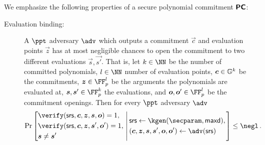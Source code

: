 \documentclass[runningheads,11pt]{llncs}
\begin{document}
We emphasize the following properties of a secure polynomial commitment
$\bm{\mathsf{PC}}$:
\begin{description}
\item[Evaluation binding:] A $\ppt$ adversary $\adv$ which outputs a commitment
  $\vec{c}$ and evaluation points $\vec{z}$ has at most negligible chances to open
  the commitment to two different evaluations $\vec{s}, \vec{s'}$. That is, let
  $k \in \NN$ be the number of committed polynomials, $l \in \NN$ number of
  evaluation points, $\vec{c} \in \GRP^k$ be the commitments, $\vec{z} \in
  \FF_p^l$ be the arguments the polynomials are evaluated at, $\vec{s},\vec{s}'
  \in \FF_p^k$ the evaluations, and $\vec{o},\vec{o}' \in \FF_p^l$ be the
  commitment openings. Then for every $\ppt$ adversary $\adv$
	\[
		\Pr
			\left[
			\begin{aligned}
				& \verify(\srs, \vec{c}, \vec{z}, \vec{s}, \vec{o}) = 1,  \\ 
				& \verify(\srs, \vec{c}, \vec{z}, \vec{s}', \vec{o}') = 1, \\
				& \vec{s} \neq \vec{s}'
			\end{aligned}
			\,\left|\,\vphantom{\begin{aligned}
                  & \\
                  & \\
                  &
                \end{aligned}}
			\begin{aligned}
				& \srs \gets \kgen(\secparam, \maxdeg),\\
				& (\vec{c}, \vec{z}, \vec{s}, \vec{s}', \vec{o}, \vec{o}') \gets \adv(\srs)
			\end{aligned}
			\right.\right] \leq \negl\,.
	\]

\end{description}
	
\end{document}
